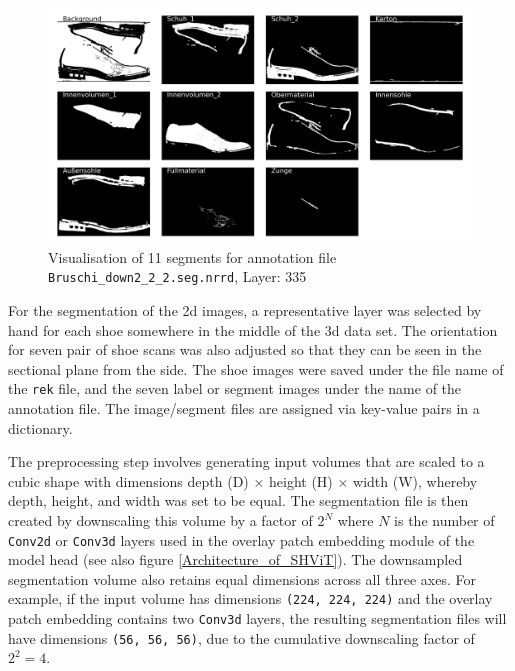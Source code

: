 \begin{figure}[H]
	\centering
	\includegraphics[width=1.0\textwidth]{./images/Layer_335_v2.png}
	\caption[Visualisation of all 11 segments for annotation file {\tt Bruschi\_down2\_2\_2}]{Visualisation of 11 segments for annotation file {\tt Bruschi\_down2\_2\_2.seg.nrrd}, Layer: 335}
	\label{Bruschi_down2_2_2_Segmentation}
\end{figure}

For the segmentation of the \gls{2d} images, a representative layer was selected by hand for each shoe somewhere in the middle of the \gls{3d} data set. The orientation for seven pair of shoe scans was also adjusted so that they can be seen in the sectional plane from the side. The shoe images were saved under the file name of the {\tt rek} file, and the seven label or segment images under the name of the annotation file. The image/segment files are assigned via key-value pairs in a dictionary. 

\medskip

The preprocessing step involves generating input volumes that are scaled to a cubic shape with dimensions depth (D) $\times$ height (H) $\times$ width (W), whereby depth, height, and width was set to be equal.  The segmentation file is then created by downscaling this volume by a factor of $2^N$ where $N$ is the number of {\tt Conv2d} or {\tt Conv3d} layers used in the overlay patch embedding module of the model head (see also figure \ref{Architecture_of_SHViT}). The downsampled segmentation volume also retains equal dimensions across all three axes. For example, if the input volume has dimensions {\tt (224, 224, 224)} and the overlay patch embedding contains two {\tt Conv3d} layers, the resulting segmentation files will have dimensions {\tt (56, 56, 56)}, due to the cumulative downscaling factor of $2^2=4$.



